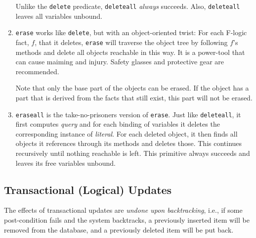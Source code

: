 \documentclass[11pt]{article}
\newcommand{\fl}{\mbox{F-logic}\xspace}
\begin{document}
\begin{enumerate}
  \smallskip
  
  Unlike the {\tt delete} predicate, {\tt deleteall} \emph{always}
  succeeds. Also, {\tt deleteall} leaves all variables unbound.
  
\item {\tt erase} works like {\tt delete}, but with an object-oriented
  twist: For each \fl fact, $f$, that it deletes, {\tt erase} will
  traverse the object tree by following $f$'s methods and delete all
  objects reachable in this way. It is a power-tool that can cause
  maiming and injury. Safety glasses and protective gear are
  recommended.
  
  Note that only the base part of the objects can be erased. If the
  object has a part that is derived from the facts that still exist, this
  part will not be erased.
  
\item {\tt eraseall} is the take-no-prisoners version of {\tt erase}.
  Just like {\tt deleteall}, it first computes \emph{query} and for each
  binding of variables it deletes the corresponding instance of
  \emph{literal}. For each deleted object, it then finds all objects it
  references through its methods and deletes those. This continues
  recursively until nothing reachable is left.  This primitive always
  succeeds and leaves its free variables unbound.
\end{enumerate}


\subsection{Transactional (Logical) Updates}\label{sec-trans-updates}


%
The effects of transactional updates are \emph{undone upon backtracking},
i.e., if
some post-condition fails and the system backtracks, a previously inserted
item will be removed from the database, and a previously deleted item will be
put back.
\end{document}
